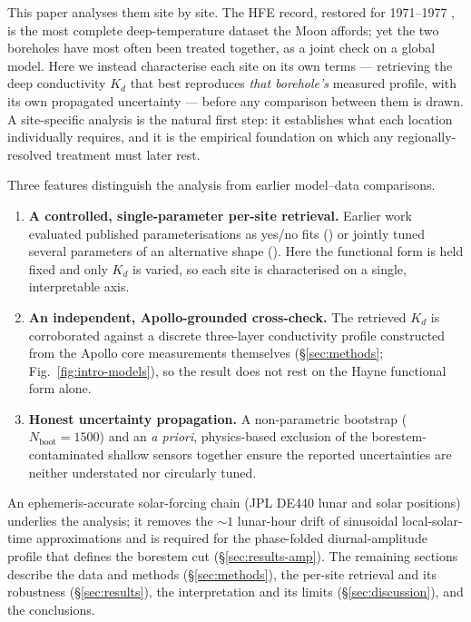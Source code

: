 \documentclass[11pt]{article}
\begin{document}
This paper analyses them site by site. The HFE record, restored for
1971--1977 \citep{nagihara2018}, is the most complete deep-temperature
dataset the Moon affords; yet the two boreholes have most often been
treated together, as a joint check on a global model. Here we instead
characterise each site on its own terms --- retrieving the deep
conductivity $K_d$ that best reproduces \emph{that borehole's}
measured profile, with its own propagated uncertainty --- before any
comparison between them is drawn. A site-specific analysis is the
natural first step: it establishes what each location individually
requires, and it is the empirical foundation on which any
regionally-resolved treatment must later rest.

Three features distinguish the analysis from earlier model--data
comparisons.
\begin{enumerate}\itemsep1pt
  \item[(i)] \textbf{A controlled, single-parameter per-site
        retrieval.} Earlier work evaluated published
        parameterisations as yes/no fits
        (\citealt{vasavada2012,hayne2017,nagihara2018}) or jointly
        tuned several parameters of an alternative shape
        (\citealt{martinez2021}). Here the \citet{hayne2017}
        functional form is held fixed and only $K_d$ is varied, so
        each site is characterised on a single, interpretable axis.
  \item[(ii)] \textbf{An independent, Apollo-grounded cross-check.}
        The retrieved $K_d$ is corroborated against a discrete
        three-layer conductivity profile constructed from the Apollo
        core measurements themselves (\S\ref{sec:methods};
        Fig.~\ref{fig:intro-models}), so the result does not rest on
        the Hayne functional form alone.
  \item[(iii)] \textbf{Honest uncertainty propagation.} A
        non-parametric bootstrap ($N_\mathrm{boot}=1500$) and an
        \emph{a priori}, physics-based exclusion of the
        borestem-contaminated shallow sensors together ensure the
        reported uncertainties are neither understated nor
        circularly tuned.
\end{enumerate}
An ephemeris-accurate solar-forcing chain (JPL DE440 lunar and solar
positions) underlies the analysis; it removes the $\sim\!1$
lunar-hour drift of sinusoidal local-solar-time approximations and is
required for the phase-folded diurnal-amplitude profile that defines
the borestem cut (\S\ref{sec:results-amp}). The remaining sections
describe the data and methods (\S\ref{sec:methods}), the per-site
retrieval and its robustness (\S\ref{sec:results}), the
interpretation and its limits (\S\ref{sec:discussion}), and the
conclusions.
\end{document}
